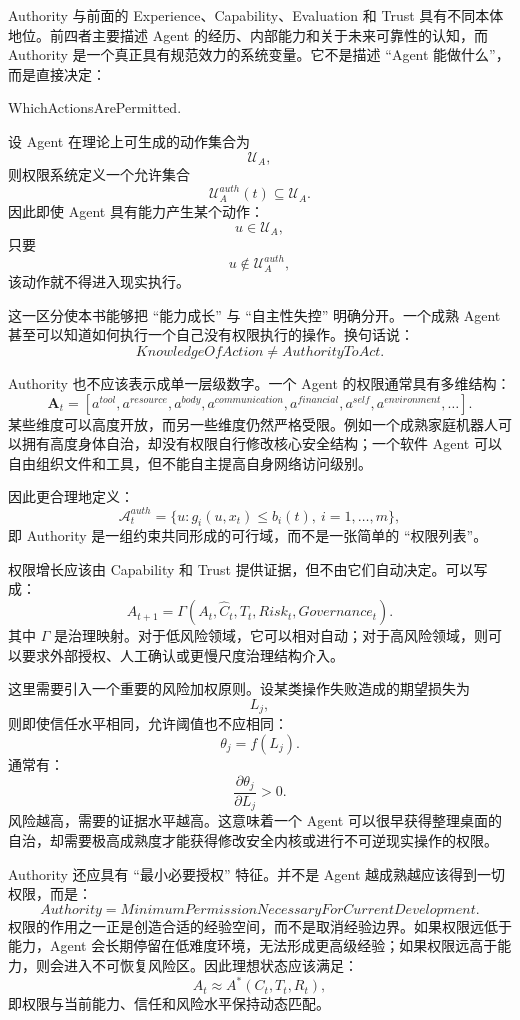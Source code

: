 Authority 与前面的 Experience、Capability、Evaluation 和 Trust 具有不同本体地位。前四者主要描述 Agent 的经历、内部能力和关于未来可靠性的认知，而 Authority 是一个真正具有规范效力的系统变量。它不是描述 ``Agent 能做什么''，而是直接决定：
\begin{statementbox}
WhichActionsArePermitted.
\end{statementbox}

设 Agent 在理论上可生成的动作集合为
\[
\mathcal U_A,
\]
则权限系统定义一个允许集合
\[
\mathcal U_A^{auth}(t)
\subseteq
\mathcal U_A.
\]
因此即使 Agent 具有能力产生某个动作：
\[
u\in\mathcal U_A,
\]
只要
\[
u\notin
\mathcal U_A^{auth},
\]
该动作就不得进入现实执行。

这一区分使本书能够把 ``能力成长'' 与 ``自主性失控'' 明确分开。一个成熟 Agent 甚至可以知道如何执行一个自己没有权限执行的操作。换句话说：
\[
\boxed{
KnowledgeOfAction
\neq
AuthorityToAct.
}
\]

Authority 也不应该表示成单一层级数字。一个 Agent 的权限通常具有多维结构：
\[
\mathbf A_t
=
[
a^{tool},
a^{resource},
a^{body},
a^{communication},
a^{financial},
a^{self},
a^{environment},
\ldots
].
\]
某些维度可以高度开放，而另一些维度仍然严格受限。例如一个成熟家庭机器人可以拥有高度身体自治，却没有权限自行修改核心安全结构；一个软件 Agent 可以自由组织文件和工具，但不能自主提高自身网络访问级别。

因此更合理地定义：
\[
\mathcal A^{auth}_t
=
\{
u:
g_i(u,x_t)\leq b_i(t),
\ i=1,\ldots,m
\},
\]
即 Authority 是一组约束共同形成的可行域，而不是一张简单的 ``权限列表''。

权限增长应该由 Capability 和 Trust 提供证据，但不由它们自动决定。可以写成：
\[
A_{t+1}
=
\Gamma
\left(
A_t,
\hat C_t,
T_t,
Risk_t,
Governance_t
\right).
\]
其中 $\Gamma$ 是治理映射。对于低风险领域，它可以相对自动；对于高风险领域，则可以要求外部授权、人工确认或更慢尺度治理结构介入。

这里需要引入一个重要的风险加权原则。设某类操作失败造成的期望损失为
\[
L_j,
\]
则即使信任水平相同，允许阈值也不应相同：
\[
\theta_j
=
f(L_j).
\]
通常有：
\[
\frac{\partial\theta_j}{\partial L_j}>0.
\]
风险越高，需要的证据水平越高。这意味着一个 Agent 可以很早获得整理桌面的自治，却需要极高成熟度才能获得修改安全内核或进行不可逆现实操作的权限。

Authority 还应具有 ``最小必要授权'' 特征。并不是 Agent 越成熟越应该得到一切权限，而是：
\[
\boxed{
Authority
=
MinimumPermissionNecessaryForCurrentDevelopment.
}
\]
权限的作用之一正是创造合适的经验空间，而不是取消经验边界。如果权限远低于能力，Agent 会长期停留在低难度环境，无法形成更高级经验；如果权限远高于能力，则会进入不可恢复风险区。因此理想状态应该满足：
\[
A_t
\approx
A^*(C_t,T_t,R_t),
\]
即权限与当前能力、信任和风险水平保持动态匹配。

